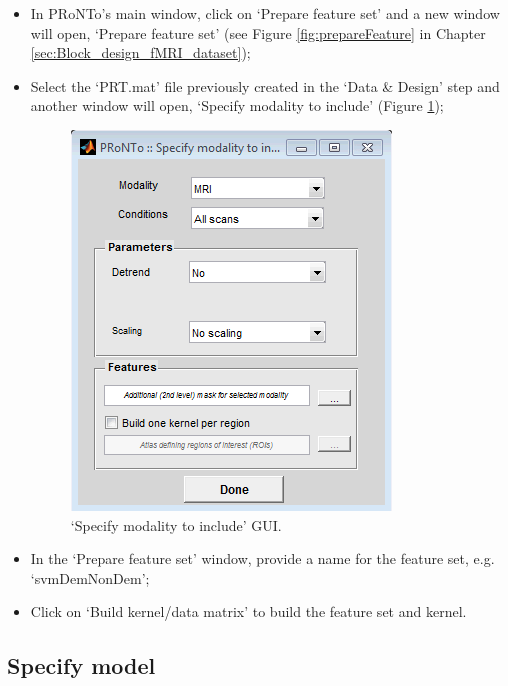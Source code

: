 \begin{itemize}
	
	\item In PRoNTo's main window, click on `Prepare feature set' and a new window will open, `Prepare feature set' (see Figure \ref{fig:prepareFeature} in Chapter \ref{sec:Block_design_fMRI_dataset});
	\item Select the `PRT.mat' file previously created in the `Data \& Design' step and another window will open, `Specify modality to include' (Figure \ref{fig:specifyModality});

	
	\begin{figure}[!h]
	\centering
		\includegraphics[scale=0.7]{images/Tutorial/confounds/specify_modality.png}
	\caption{`Specify modality to include' GUI.}
	\label{fig:specifyModality}
	\end{figure}
		
	\item In the `Prepare feature set' window, provide a name for the feature set, e.g. `svmDemNonDem';

	\item Click on `Build kernel/data matrix' to build the feature set and kernel.

\end{itemize}




\subsection{Specify model}

